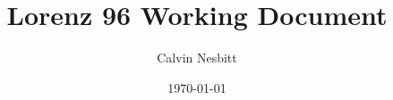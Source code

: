 \documentclass[11pt,a4,oneside]{article}
\title{Lorenz 96 Working Document}
\date{\today}
\author{Calvin Nesbitt}
\begin{document}
\maketitle


\tableofcontents
\newpage
{}
%
%
% 
%
%
\newcommand{\patha}{tex/Methodology}





% 
% 

\renewcommand{\patha}{tex/L96-Results}
% 



\clearpage

 \newcommand{\bibLocation}{/Users/cfn18/Documents/PhD-Work/PhD-Latex-Repository/BibTex-Files} %
\end{document}
